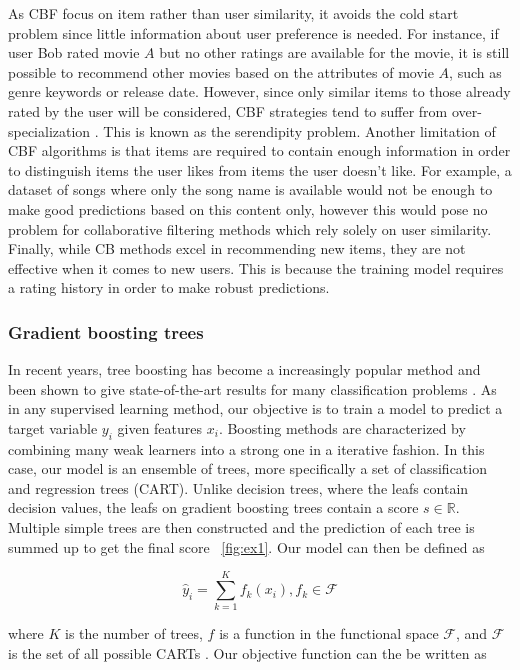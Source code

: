 \documentclass[cic,tc,english]{iiufrgs}
\begin{document}
As CBF focus on item rather than user similarity, it avoids the cold start problem since little information about user preference is needed. For instance, if user Bob rated movie $A$ but no other ratings are available for the movie, it is still possible to recommend other movies based on the attributes of movie $A$, such as genre keywords or release date. However, since only similar items to those already rated by the user will be considered, CBF strategies tend to suffer from over-specialization \cite{Iaquinta2008}. This is known as the serendipity problem. Another limitation of CBF algorithms is that items are required to contain enough information in order to distinguish items the user likes from items the user doesn't like. For example, a dataset of songs where only the song name is available would not be enough to make good predictions based on this content only, however this would pose no problem for collaborative filtering methods which rely solely on user similarity. Finally, while CB methods excel in recommending new items, they are not effective when it comes to new users. This is because the training model requires a rating history in order to make robust predictions.

\subsubsection{Gradient boosting trees}
In recent years, tree boosting has become a increasingly popular method and been shown to give state-of-the-art results for many classification problems \cite{Li2012}. As in any supervised learning method, our objective is to train a model to predict a target variable $y_i$ given features $x_i$. Boosting methods are characterized by combining many weak learners into a strong one in a iterative fashion. In this case, our model is an ensemble of trees, more specifically a set of classification and regression trees (CART). Unlike decision trees, where the leafs contain decision values, the leafs on gradient boosting trees contain a score $s \in \mathbb{R}$. Multiple simple trees are then constructed and the prediction of each tree is summed up to get the final score ~\ref{fig:ex1}. Our model can then be defined as

$$\hat{y}_i = \sum_{k=1}^K f_k(x_i), f_k \in \mathcal{F}$$

where \(K\) is the number of trees, \(f\) is a function in the functional space $\mathcal{F}$, and $\mathcal{F}$ is the set of all possible CARTs \cite{Chen2016}. Our objective function can the be written as
\end{document}
